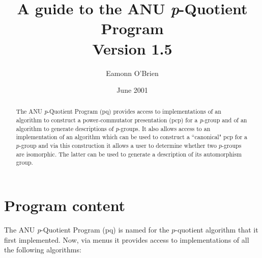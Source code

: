 \documentclass[12pt]{article}
\begin{document}
\title{A guide to the ANU {\it p}-Quotient Program\\Version 1.5}
\author{Eamonn O'Brien}
\date{June 2001}
\maketitle
\tableofcontents
\pagebreak

\begin{abstract}
The ANU {\it p}-Quotient Program (pq) provides access to implementations
of an algorithm to construct a power-commutator presentation (pcp) for 
a {\it p}-group and of an algorithm to generate descriptions of 
{\it p}-groups.  It also allows access to an implementation
of an algorithm which can be used to construct a ``canonical" 
pcp for a $p$-group and via this construction it allows a user 
to determine whether two $p$-groups are isomorphic. The latter
can be used to generate a description of its automorphism group.
\end{abstract}

\section{Program content}\label{sec:prog-content}
The ANU {\it p}-Quotient Program (pq) is named for the $p$-quotient algorithm
that it first implemented. Now, via menus it provides access to implementations
of all the following algorithms:
\end{document}
